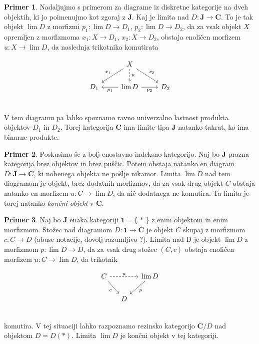 \documentclass[12pt,a4paper]{book}
\theoremstyle{definition}
\theoremstyle{plain}
\theoremstyle{definition}
\newtheorem{primer}{Primer}[section]
\theoremstyle{remark}
\newcommand{\cat}[1]{\textbf{#1}}
\renewcommand{\set}[1]{\{\,#1\,\}}
\begin{document}
\begin{primer}
Nadaljujmo s primerom za diagrame iz diskretne kategorije na dveh objektih, ki jo poimenujmo kot zgoraj z $\cat{J}$. Kaj je limita nad $D : \cat{J} \to \cat{C}$. To je tak objekt $\lim D$ z morfizmi $p_1 : \lim D \to D_1$, $p_2 : \lim D \to D_2$, da za vsak objekt $X$ opremljen z morfizmoma $x_1 : X \to D_1$, $x_2 : X \to D_2$, obstaja enoličen morfizem $u : X \to \lim D$, da naslednja trikotnika komutirata 

$$\begin{tikzcd}
& X \ar[dl, "x_1"'] \ar[d, dashed, "u"] \ar[dr, "x_2"] & \\
D_1 & \lim D \ar[l, "p_1"] \ar[r, "p_2"'] & D_2 \\
\end{tikzcd}$$

V tem diagramu pa lahko spoznamo ravno univerzalno lastnost produkta objektov $D_1$ in $D_2$. Torej kategorija $\cat{C}$ ima limite tipa $\cat{J}$ natanko takrat, ko ima binarne produkte.

\end{primer}

\begin{primer}
Poskusimo še z bolj enostavno indeksno kategorijo. Naj bo $\cat{J}$ prazna kategorija brez objektov in brez puščic. Potem obstaja natanko en diagram $D : \cat{J} \to \cat{C}$, ki nobenega objekta ne pošlje nikamor. Limita $\lim D$ nad tem diagramom je objekt, brez dodatnih morfizmov, da za vsak drug objekt $C$ obstaja natanko en morfizem $u : C \to \lim D$, da nič dodatnega ne komutira. Ta limita je torej natanko \textit{končni objekt} v $\cat{C}$.
\end{primer}

\begin{primer}
Naj bo $\cat{J}$ enaka kategoriji $\cat{1} = \set{\ast}$ z enim objektom in enim morfizmom. Stožec nad diagramom $D : \cat{1} \to \cat{C}$ je objekt $C$ skupaj z morfizmom $c : C \to D$ (abuse notacije, dovolj razumljivo ?). Limita nad D je objekt $\lim D$ z morfizmom $p : \lim D \to D$, da za vsak drug stožec $(C, c)$ obstaja enoličen morfizem $u : C \to \lim D$, da trikotnik

$$\begin{tikzcd}[column sep=small]
C \ar[dr, "c"'] \ar[rr, dashed, "u"] & & \lim D \ar[dl, "p"] \\
& D & \\
\end{tikzcd}$$
komutira. V tej situaciji lahko razpoznamo rezinsko kategorijo $\cat{C}/D$ nad objektom $D = D(\ast)$. Limita $\lim D$ je končni objekt v tej kategoriji.
\end{primer}
\end{document}
